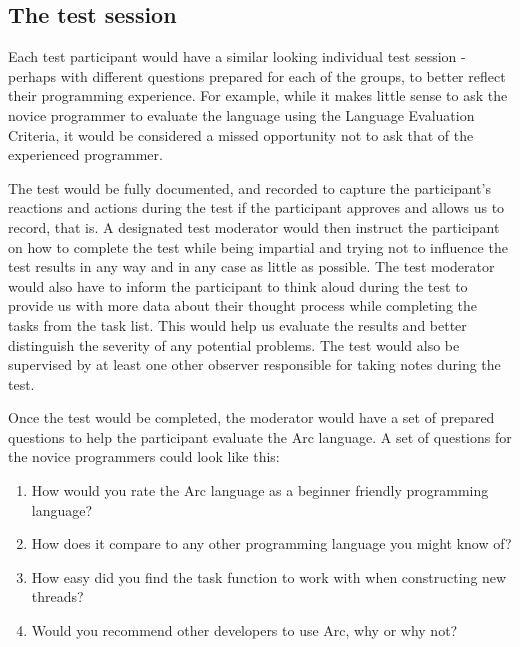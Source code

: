 
\subsection{The test session}\label{subsubsec:theTestSession}

Each test participant would have a similar looking individual test session - perhaps with different questions prepared for each of the groups, to better reflect their programming experience. For example, while it makes little sense to ask the novice programmer to evaluate the language using the Language Evaluation Criteria, it would be considered a missed opportunity not to ask that of the experienced programmer.

The test would be fully documented, and recorded to capture the participant's reactions and actions during the test if the participant approves and allows us to record, that is. A designated test moderator would then instruct the participant on how to complete the test while being impartial and trying not to influence the test results in any way and in any case as little as possible. The test moderator would also have to inform the participant to think aloud during the test to provide us with more data about their thought process while completing the tasks from the task list. This would help us evaluate the results and better distinguish the severity of any potential problems. The test would also be supervised by at least one other observer responsible for taking notes during the test.

Once the test would be completed, the moderator would have a set of prepared questions to help the participant evaluate the Arc language. A set of questions for the novice programmers could look like this:

\begin{enumerate}
    \item How would you rate the Arc language as a beginner friendly programming language?
    \item How does it compare to any other programming language you might know of?
    \item How easy did you find the task function to work with when constructing new threads?
    \item Would you recommend other developers to use Arc, why or why not?
\end{enumerate}

